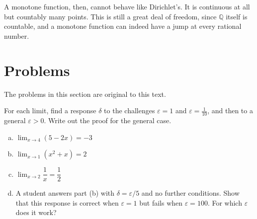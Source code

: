 \begin{marginfigure}
\centering
{}
\caption{Each jump of an increasing function leaves a gap on the vertical axis.  The gaps do not overlap, and each one contains a rational number of its own.}
\end{marginfigure}

A monotone function, then, cannot behave like Dirichlet's.  It is continuous at all but countably many points.  This is still a great deal of freedom, since $\mathbb{Q}$ itself is countable, and a monotone function can indeed have a jump at every rational number.

\section{Problems}

\noindent The problems in this section are original to this text.

\begin{problem}
For each limit, find a response $\delta$ to the challenges $\varepsilon = 1$ and $\varepsilon = \frac{1}{10}$, and then to a general $\varepsilon > 0$.  Write out the proof for the general case.
\begin{enumerate}[(a)]
	\item $\lim_{x \to 4} (5 - 2x) = -3$
	\item $\lim_{x \to 1} (x^2 + x) = 2$
	\item $\lim_{x \to 2} \dfrac1x = \dfrac12$
	\item A student answers part (b) with $\delta = \varepsilon/5$ and no further conditions.  Show that this response is correct when $\varepsilon = 1$ but fails when $\varepsilon = 100$.  For which $\varepsilon$ does it work?
\end{enumerate}
\end{problem}

